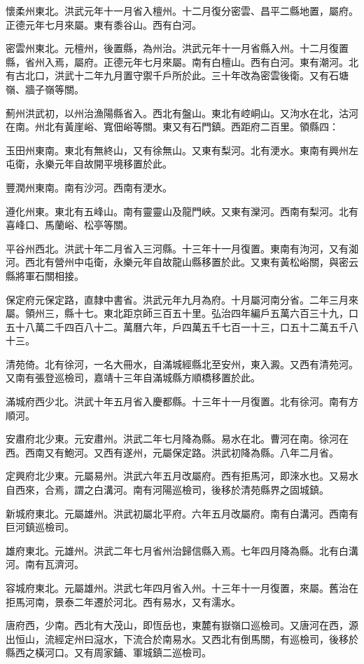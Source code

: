 懷柔州東北。洪武元年十一月省入檀州。十二月復分密雲、昌平二縣地置，屬府。正德元年七月來屬。東有黍谷山。西有白河。

密雲州東北。元檀州，後置縣，為州治。洪武元年十一月省縣入州。十二月復置縣，省州入焉，屬府。正德元年七月來屬。南有白檀山。西有白河。東有潮河。北有古北口，洪武十二年九月置守禦千戶所於此。三十年改為密雲後衛。又有石塘嶺、牆子嶺等關。

薊州洪武初，以州治漁陽縣省入。西北有盤山。東北有崆峒山。又泃水在北，沽河在南。州北有黃崖峪、寬佃峪等關。東又有石門鎮。西距府二百里。領縣四：

玉田州東南。東北有無終山，又有徐無山。又東有梨河。北有浭水。東南有興州左屯衛，永樂元年自故開平境移置於此。

豐潤州東南。南有沙河。西南有浭水。

遵化州東。東北有五峰山。南有靈靈山及龍門峽。又東有灤河。西南有梨河。北有喜峰口、馬蘭峪、松亭等關。

平谷州西北。洪武十年二月省入三河縣。十三年十一月復置。東南有泃河，又有洳河。西北有營州中屯衛，永樂元年自故龍山縣移置於此。又東有黃松峪關，與密云縣將軍石關相接。

保定府元保定路，直隸中書省。洪武元年九月為府。十月屬河南分省。二年三月來屬。領州三，縣十七。東北距京師三百五十里。弘治四年編戶五萬六百三十九，口五十八萬二千四百八十二。萬曆六年，戶四萬五千七百一十三，口五十二萬五千八十三。

清苑倚。北有徐河，一名大冊水，自滿城經縣北至安州，東入澱。又西有清苑河。又南有張登巡檢司，嘉靖十三年自滿城縣方順橋移置於此。

滿城府西少北。洪武十年五月省入慶都縣。十三年十一月復置。北有徐河。南有方順河。

安肅府北少東。元安肅州。洪武二年七月降為縣。易水在北。曹河在南。徐河在西。西南又有鮑河。又西有遂州，元屬保定路。洪武初降為縣。八年二月省。

定興府北少東。元屬易州。洪武六年五月改屬府。西有拒馬河，即淶水也。又易水自西來，合焉，謂之白溝河。南有河陽巡檢司，後移於清苑縣界之固城鎮。

新城府東北。元屬雄州。洪武初屬北平府。六年五月改屬府。南有白溝河。西南有巨河鎮巡檢司。

雄府東北。元雄州。洪武二年七月省州治歸信縣入焉。七年四月降為縣。北有白溝河。南有瓦濟河。

容城府東北。元屬雄州。洪武七年四月省入州。十三年十一月復置，來屬。舊治在拒馬河南，景泰二年遷於河北。西有易水，又有濡水。

唐府西，少南。西北有大茂山，即恆岳也，東麓有嶽嶺口巡檢司。又唐河在西，源出恒山，流經定州曰滱水，下流合於南易水。又西北有倒馬關，有巡檢司，後移於縣西之橫河口。又有周家鋪、軍城鎮二巡檢司。

